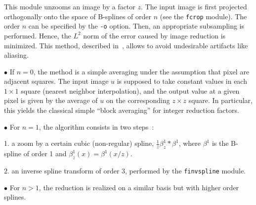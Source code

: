 This module unzooms an image by a factor $z$. The input image is first
projected orthogonally onto the space of B-splines 
of order $n$ (see
the \verb+fcrop+ module). The order $n$ can be specified 
by the \verb+-o+ option. Then, an appropriate subsampling is performed.
Hence, the $L^2$ norm of the error caused by image reduction is minimized.
This method, described in~\cite{unser.aldroubi.ea:enlargement}, allows to 
avoid undesirable artifacts like aliasing. 

\medskip

$\bullet$ 
If $n=0$, the method is a simple averaging under the assumption that pixel
are adjacent squares. The input image $u$ is supposed to take constant values
in each $1\times 1$ square (nearest neighbor interpolation), and the output
value at a given pixel is given by the average of $u$ on the corresponding
$z\times z$ square. In particular, this yields the classical simple 
``block averaging'' for integer reduction factors.

\medskip

$\bullet$ 
For $n= 1$, the algorithm consists in two steps~:

1. a zoom by a certain cubic (non-regular) spline, 
$\frac 1z \beta^1_z * \beta^1$, where $\beta^1$ is the 
B-spline of order 1 and $\beta^1_z(x)=\beta^1(x/z)$.

2. an inverse spline transform of order 3, performed by the
\verb+finvspline+ module.

\medskip

$\bullet$ 
For $n> 1$, the reduction is realized on a similar basis but with higher 
order splines.
